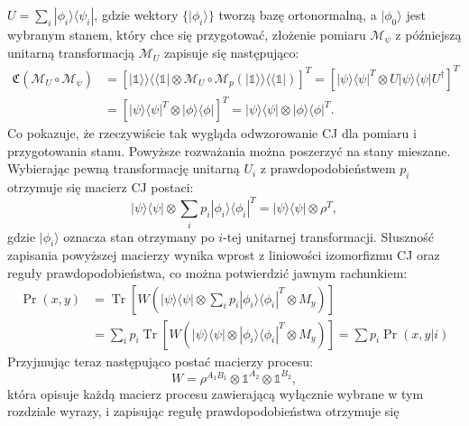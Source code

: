 \documentclass[10pt]{article} %
\DeclareMathOperator{\Trs}{Tr}
\newcommand{\Ket}[1]{|#1\rangle}
\newcommand{\Bra}[1]{\langle#1|}
\newcommand{\BBra}[1]{\langle\langle#1|}
\newcommand{\KKet}[1]{|#1\rangle\rangle}
\newcommand{\KP}{\Ket{\psi}}
\newcommand{\BP}{\Bra{\psi}}
\newcommand{\I}{\mathbb{1}}
\newcommand{\MCJ}{\mathfrak{C}}
\begin{document}
$U = \sum_i \Ket{\phi_i}\Bra{\psi_i}$, gdzie wektory $\{ \Ket{\phi_i} \}$ tworzą bazę ortonormalną, a $\Ket{\phi_0}$ jest wybranym stanem, który chce się przygotować, złożenie pomiaru $\mathcal{M}_\psi$ z późniejszą unitarną transformacją $\mathcal{M}_U$ zapisuje się następująco:
\begin{equation}
\begin{split}
\MCJ(\mathcal{M}_U \circ \mathcal{M}_\psi) &= \left[ \KKet{\I}\BBra{\I} \otimes \mathcal{M}_U \circ \mathcal{M}_p\left(\KKet{\I}\BBra{\I}\right)\right]^T = \left[\Ket{\psi}\Bra{\psi}^T \otimes U \Ket{\psi}\Bra{\psi} U^\dag \right]^T\\ &= \left[ \Ket{\psi}\Bra{\psi}^T \otimes \Ket{\phi}\Bra{\phi} \right]^T = \Ket{\psi}\Bra{\psi} \otimes \Ket{\phi}\Bra{\phi}^T.
\end{split}
\end{equation}
Co pokazuje, że rzeczywiście tak wygląda odwzorowanie CJ dla pomiaru i przygotowania stanu. Powyższe rozważania można poszerzyć na stany mieszane. Wybierając pewną transformację unitarną $U_i$ z prawdopodobieństwem $p_i$ otrzymuje się macierz CJ postaci:
\begin{equation}
\Ket{\psi}\Bra{\psi} \otimes \sum_i p_i \Ket{\phi_i}\Bra{\phi_i}^T = \Ket{\psi}\Bra{\psi} \otimes \rho^T,
\end{equation}
gdzie $\Ket{\phi_i}$ oznacza stan otrzymany po $i$-tej unitarnej transformacji. Słuszność zapisania powyższej macierzy wynika wprost z liniowości izomorfizmu CJ oraz reguły prawdopodobieństwa, co można potwierdzić jawnym rachunkiem:
\begin{equation}
\begin{split}
\Pr(x,y) &= \Trs\left[ W \left( \KP\BP \otimes \sum_i p_i \Ket{\phi_i}\Bra{\phi_i}^T \otimes M_y\right)\right]\\& = \sum_i p_i \Trs\left[ W \left( \KP\BP \otimes \Ket{\phi_i}\Bra{\phi_i}^T \otimes M_y\right)\right] = \sum p_i \Pr(x,y|i)
\end{split}
\end{equation}
Przyjmując teraz następująco postać macierzy procesu:
\begin{equation}
W = \rho^{A_1B_1} \otimes \I^{A_2} \otimes \I^{B_2},
\end{equation} która opisuje każdą macierz procesu zawierającą wyłącznie wybrane w tym rozdziale wyrazy, i zapisując regułę prawdopodobieństwa otrzymuje się
\end{document}
